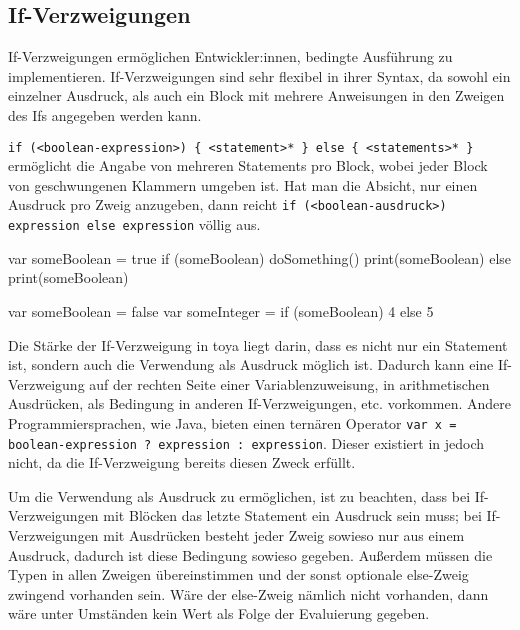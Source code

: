 \subsection{If-Verzweigungen}

If-Verzweigungen ermöglichen Entwickler:innen, bedingte Ausführung zu implementieren. If-Verzweigungen sind sehr flexibel in ihrer Syntax, da sowohl ein einzelner Ausdruck, als auch ein Block mit mehrere Anweisungen in den Zweigen des Ifs angegeben werden kann. 

\texttt{if (<boolean-expression>) \{ <statement>* \} else \{ <statements>* \}} ermöglicht die Angabe von mehreren Statements pro Block, wobei jeder Block von geschwungenen Klammern umgeben ist. Hat man die Absicht, nur einen Ausdruck pro Zweig anzugeben, dann reicht \texttt{if (<boolean-ausdruck>) expression else expression} völlig aus.

\begin{ToyaCode}[numbers=none, caption={If-Verzweigung als klassische Anweisung.}]
var someBoolean = true
if (someBoolean) {
    doSomething()
    print(someBoolean)
} else {
    print(someBoolean)
}
\end{ToyaCode}

\begin{ToyaCode}[numbers=none, caption={If-Verzweigung als Ausdruck in einer Variablenzuweisung.}]
var someBoolean = false
var someInteger = if (someBoolean) 4 else 5
\end{ToyaCode}

Die Stärke der If-Verzweigung in toya liegt darin, dass es nicht nur ein Statement ist, sondern auch die Verwendung als Ausdruck möglich ist. Dadurch kann eine If-Verzweigung auf der rechten Seite einer Variablenzuweisung, in arithmetischen Ausdrücken, als Bedingung in anderen If-Verzweigungen, etc. vorkommen. Andere Programmiersprachen, wie Java, bieten einen ternären Operator \texttt{var x = boolean-expression ? expression : expression}. Dieser existiert in \toya jedoch nicht, da die If-Verzweigung bereits diesen Zweck erfüllt. 


Um die Verwendung als Ausdruck zu ermöglichen, ist zu beachten, dass bei If-Verzweigungen mit Blöcken das letzte Statement ein Ausdruck sein muss; bei If-Verzweigungen mit Ausdrücken besteht jeder Zweig sowieso nur aus einem Ausdruck, dadurch ist diese Bedingung sowieso gegeben. Außerdem müssen die Typen in allen Zweigen übereinstimmen und der sonst optionale else-Zweig zwingend vorhanden sein. Wäre der else-Zweig nämlich nicht vorhanden, dann wäre unter Umständen kein Wert als Folge der Evaluierung gegeben.

